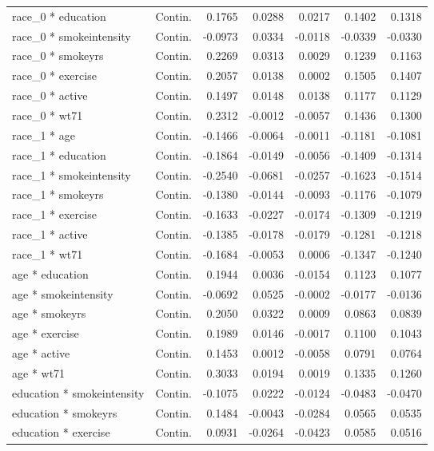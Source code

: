 \begin{table}
\begin{tabular}{llrrrrr}
race\_0 * education & Contin. & 0.1765 & 0.0288 & 0.0217 & 0.1402 & 0.1318\\
race\_0 * smokeintensity & Contin. & -0.0973 & 0.0334 & -0.0118 & -0.0339 & -0.0330\\
race\_0 * smokeyrs & Contin. & 0.2269 & 0.0313 & 0.0029 & 0.1239 & 0.1163\\
\addlinespace
race\_0 * exercise & Contin. & 0.2057 & 0.0138 & 0.0002 & 0.1505 & 0.1407\\
race\_0 * active & Contin. & 0.1497 & 0.0148 & 0.0138 & 0.1177 & 0.1129\\
race\_0 * wt71 & Contin. & 0.2312 & -0.0012 & -0.0057 & 0.1436 & 0.1300\\
race\_1 * age & Contin. & -0.1466 & -0.0064 & -0.0011 & -0.1181 & -0.1081\\
race\_1 * education & Contin. & -0.1864 & -0.0149 & -0.0056 & -0.1409 & -0.1314\\
\addlinespace
race\_1 * smokeintensity & Contin. & -0.2540 & -0.0681 & -0.0257 & -0.1623 & -0.1514\\
race\_1 * smokeyrs & Contin. & -0.1380 & -0.0144 & -0.0093 & -0.1176 & -0.1079\\
race\_1 * exercise & Contin. & -0.1633 & -0.0227 & -0.0174 & -0.1309 & -0.1219\\
race\_1 * active & Contin. & -0.1385 & -0.0178 & -0.0179 & -0.1281 & -0.1218\\
race\_1 * wt71 & Contin. & -0.1684 & -0.0053 & 0.0006 & -0.1347 & -0.1240\\
\addlinespace
age * education & Contin. & 0.1944 & 0.0036 & -0.0154 & 0.1123 & 0.1077\\
age * smokeintensity & Contin. & -0.0692 & 0.0525 & -0.0002 & -0.0177 & -0.0136\\
age * smokeyrs & Contin. & 0.2050 & 0.0322 & 0.0009 & 0.0863 & 0.0839\\
age * exercise & Contin. & 0.1989 & 0.0146 & -0.0017 & 0.1100 & 0.1043\\
age * active & Contin. & 0.1453 & 0.0012 & -0.0058 & 0.0791 & 0.0764\\
\addlinespace
age * wt71 & Contin. & 0.3033 & 0.0194 & 0.0019 & 0.1335 & 0.1260\\
education * smokeintensity & Contin. & -0.1075 & 0.0222 & -0.0124 & -0.0483 & -0.0470\\
education * smokeyrs & Contin. & 0.1484 & -0.0043 & -0.0284 & 0.0565 & 0.0535\\
education * exercise & Contin. & 0.0931 & -0.0264 & -0.0423 & 0.0585 & 0.0516\\

\end{tabular}
\end{table}
